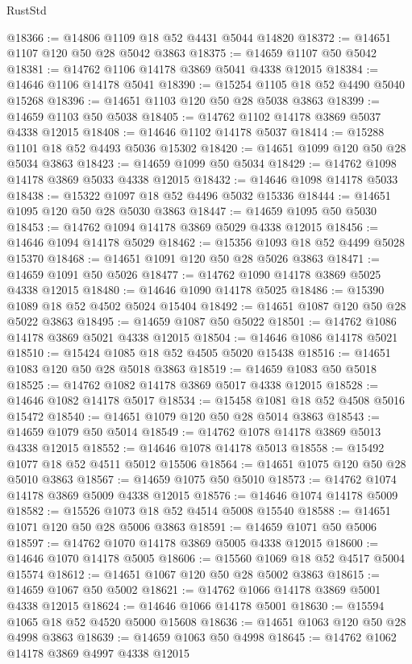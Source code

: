 \begin{lexlean}{RustStd}
\begin{coremodule}
@18366 := @14806 @1109 @18 @52 @4431 @5044 @14820
@18372 := @14651 @1107 @120 @50 @28 @5042 @3863
@18375 := @14659 @1107 @50 @5042
@18381 := @14762 @1106 @14178 @3869 @5041 @4338 @12015
@18384 := @14646 @1106 @14178 @5041
@18390 := @15254 @1105 @18 @52 @4490 @5040 @15268
@18396 := @14651 @1103 @120 @50 @28 @5038 @3863
@18399 := @14659 @1103 @50 @5038
@18405 := @14762 @1102 @14178 @3869 @5037 @4338 @12015
@18408 := @14646 @1102 @14178 @5037
@18414 := @15288 @1101 @18 @52 @4493 @5036 @15302
@18420 := @14651 @1099 @120 @50 @28 @5034 @3863
@18423 := @14659 @1099 @50 @5034
@18429 := @14762 @1098 @14178 @3869 @5033 @4338 @12015
@18432 := @14646 @1098 @14178 @5033
@18438 := @15322 @1097 @18 @52 @4496 @5032 @15336
@18444 := @14651 @1095 @120 @50 @28 @5030 @3863
@18447 := @14659 @1095 @50 @5030
@18453 := @14762 @1094 @14178 @3869 @5029 @4338 @12015
@18456 := @14646 @1094 @14178 @5029
@18462 := @15356 @1093 @18 @52 @4499 @5028 @15370
@18468 := @14651 @1091 @120 @50 @28 @5026 @3863
@18471 := @14659 @1091 @50 @5026
@18477 := @14762 @1090 @14178 @3869 @5025 @4338 @12015
@18480 := @14646 @1090 @14178 @5025
@18486 := @15390 @1089 @18 @52 @4502 @5024 @15404
@18492 := @14651 @1087 @120 @50 @28 @5022 @3863
@18495 := @14659 @1087 @50 @5022
@18501 := @14762 @1086 @14178 @3869 @5021 @4338 @12015
@18504 := @14646 @1086 @14178 @5021
@18510 := @15424 @1085 @18 @52 @4505 @5020 @15438
@18516 := @14651 @1083 @120 @50 @28 @5018 @3863
@18519 := @14659 @1083 @50 @5018
@18525 := @14762 @1082 @14178 @3869 @5017 @4338 @12015
@18528 := @14646 @1082 @14178 @5017
@18534 := @15458 @1081 @18 @52 @4508 @5016 @15472
@18540 := @14651 @1079 @120 @50 @28 @5014 @3863
@18543 := @14659 @1079 @50 @5014
@18549 := @14762 @1078 @14178 @3869 @5013 @4338 @12015
@18552 := @14646 @1078 @14178 @5013
@18558 := @15492 @1077 @18 @52 @4511 @5012 @15506
@18564 := @14651 @1075 @120 @50 @28 @5010 @3863
@18567 := @14659 @1075 @50 @5010
@18573 := @14762 @1074 @14178 @3869 @5009 @4338 @12015
@18576 := @14646 @1074 @14178 @5009
@18582 := @15526 @1073 @18 @52 @4514 @5008 @15540
@18588 := @14651 @1071 @120 @50 @28 @5006 @3863
@18591 := @14659 @1071 @50 @5006
@18597 := @14762 @1070 @14178 @3869 @5005 @4338 @12015
@18600 := @14646 @1070 @14178 @5005
@18606 := @15560 @1069 @18 @52 @4517 @5004 @15574
@18612 := @14651 @1067 @120 @50 @28 @5002 @3863
@18615 := @14659 @1067 @50 @5002
@18621 := @14762 @1066 @14178 @3869 @5001 @4338 @12015
@18624 := @14646 @1066 @14178 @5001
@18630 := @15594 @1065 @18 @52 @4520 @5000 @15608
@18636 := @14651 @1063 @120 @50 @28 @4998 @3863
@18639 := @14659 @1063 @50 @4998
@18645 := @14762 @1062 @14178 @3869 @4997 @4338 @12015

\end{coremodule}
\end{lexlean}
